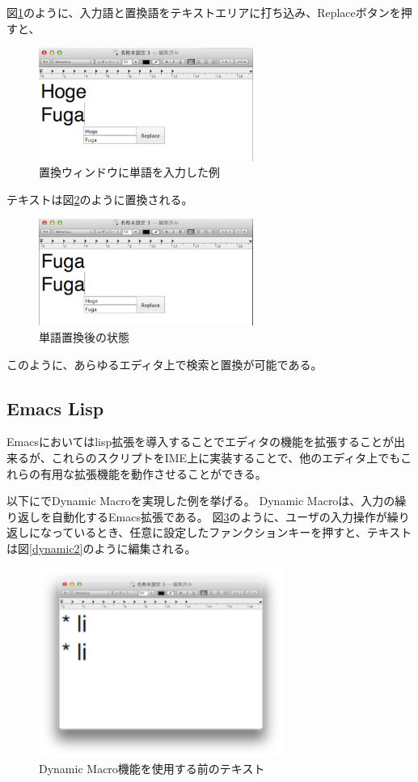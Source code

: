 図\ref{search2}のように、入力語と置換語をテキストエリアに打ち込み、Replaceボタンを押すと、

\begin{figure}[H]
\centerline{\includegraphics[width=70mm,bb=0 0 360 191]{figures/replace2.png}}
\caption{置換ウィンドウに単語を入力した例}
\label{search2}
\end{figure}


テキストは図\ref{search3}のように置換される。

\begin{figure}[H]
\centerline{\includegraphics[width=70mm,bb=0 0 360 191]{figures/replace3.png}}
\caption{単語置換後の状態}
\label{search3}
\end{figure}

このように、あらゆるエディタ上で検索と置換が可能である。

\subsection{Emacs Lisp}
Emacsにおいてはlisp拡張を導入することでエディタの機能を拡張することが出来るが、これらのスクリプトをIME上に実装することで、他のエディタ上でもこれらの有用な拡張機能を動作させることができる。

以下に{\system}でDynamic Macro\cite{DynamicMacro}を実現した例を挙げる。
Dynamic Macroは、入力の繰り返しを自動化するEmacs拡張である。
図\ref{dynamic1}のように、ユーザの入力操作が繰り返しになっているとき、任意に設定したファンクションキーを押すと、テキストは図\ref{dynamic2}のように編集される。

\begin{figure}[H]
\centerline{\includegraphics[width=80mm,bb=0 0 360 190]{figures/dynamic1.png}}
\caption{Dynamic Macro機能を使用する前のテキスト}
\label{dynamic1}
\end{figure}

